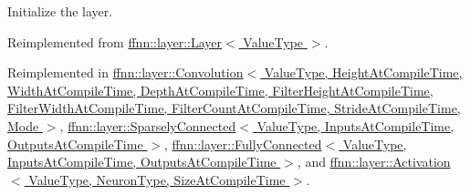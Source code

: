 Initialize the layer. 



Reimplemented from \hyperlink{classffnn_1_1layer_1_1_layer_af4d17333f47c016a379748b9318c7b50}{ffnn\-::layer\-::\-Layer$<$ Value\-Type $>$}.



Reimplemented in \hyperlink{classffnn_1_1layer_1_1_convolution_ad438bd0584804863bd064a493e2892a1}{ffnn\-::layer\-::\-Convolution$<$ Value\-Type, Height\-At\-Compile\-Time, Width\-At\-Compile\-Time, Depth\-At\-Compile\-Time, Filter\-Height\-At\-Compile\-Time, Filter\-Width\-At\-Compile\-Time, Filter\-Count\-At\-Compile\-Time, Stride\-At\-Compile\-Time, Mode $>$}, \hyperlink{classffnn_1_1layer_1_1_sparsely_connected_abb2966b5e7813c43ae2ea5448188a9fb}{ffnn\-::layer\-::\-Sparsely\-Connected$<$ Value\-Type, Inputs\-At\-Compile\-Time, Outputs\-At\-Compile\-Time $>$}, \hyperlink{classffnn_1_1layer_1_1_fully_connected_aec414194202f845b866b0e8b2a51235c}{ffnn\-::layer\-::\-Fully\-Connected$<$ Value\-Type, Inputs\-At\-Compile\-Time, Outputs\-At\-Compile\-Time $>$}, and \hyperlink{classffnn_1_1layer_1_1_activation_ae73ef2d36d9c5ce3c219f6a51cba3c35}{ffnn\-::layer\-::\-Activation$<$ Value\-Type, Neuron\-Type, Size\-At\-Compile\-Time $>$}.

